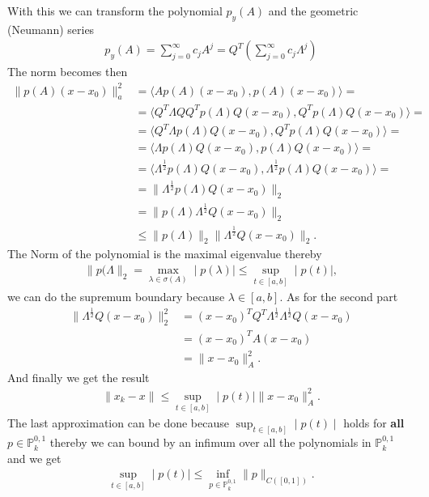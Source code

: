 With this we can transform the polynomial $p_y(A)$ and the geometric
(Neumann) series
\begin{align}
    p_y(A) = \sum_{j=0}^{\infty} c_j A^j = Q^T \left(\sum_{j=0}^{\infty} c_j
        \Lambda^j\right)
\end{align}
The norm becomes then
\begin{align}
    \|p(A) (x-x_0)\|^2_a
    &= \langle Ap(A) (x-x_0), p(A)(x-x_0)\rangle =\\
    &= \langle Q^T\Lambda Q Q^Tp(\Lambda)Q (x-x_0),
    Q^Tp(\Lambda)Q(x-x_0)\rangle =\\
    &= \langle Q^T\Lambda p(\Lambda)Q (x-x_0),
    Q^Tp(\Lambda)Q(x-x_0)\rangle =\\
    &= \langle \Lambda p(\Lambda)Q (x-x_0),
    p(\Lambda)Q(x-x_0)\rangle =\\
    &= \langle \Lambda^{\frac{1}{2}} p(\Lambda)Q (x-x_0),
    \Lambda^{\frac{1}{2}} p(\Lambda)Q(x-x_0)\rangle =\\
    &= \|\Lambda^{\frac{1}{2}}p(\Lambda)Q(x-x_0)\|_2\\
    &= \|p(\Lambda)\Lambda^{\frac{1}{2}}Q(x-x_0)\|_2\\
    &\leq \|p(\Lambda)\|_2 \|\Lambda^{\frac{1}{2}}Q(x-x_0)\|_2.
\end{align}
The Norm of the polynomial is the maximal eigenvalue thereby
\begin{align}
    \|p(\Lambda\|_2 = \max_{\lambda \in \sigma(A)}  \mid p(\lambda) \mid \leq
    \sup_{t\in[a,b]}  \mid p(t)\mid,
\end{align}
we can do the supremum boundary because $\lambda \in [a, b]$. As for the
second part
\begin{align}
    \|\Lambda^{\frac{1}{2}}Q(x-x_0)\|_2^2 &= (x-x_0)^T Q^T
    \Lambda^{\frac{1}{2}}\Lambda^{\frac{1}{2}}Q(x-x_0)\\
    &= (x-x_0)^T A (x-x_0) \\
    &= \|x-x_0\|_A^2.
\end{align}
And finally we get the result
\begin{align}
    \|x_k - x\| \le \sup_{t\in[a,b]}  \mid p(t)  \mid \|x-x_0\|_A^2.
\end{align}
The last approximation can be done because $\sup_{t\in[a,b]} \mid p(t) \mid$
holds for \textbf{all} $p \in \mathbb{P}_k^{0,1}$ thereby we can bound by an
infimum over all the polynomials in $\mathbb{P}_k^{0,1}$ and we get
\begin{align}
    \sup_{t\in[a,b]}  \mid p(t)  \mid \le \inf_{p \in \mathbb{P}_k^{0,1}}
    \|p\|_{C([0,1])}.
\end{align}
